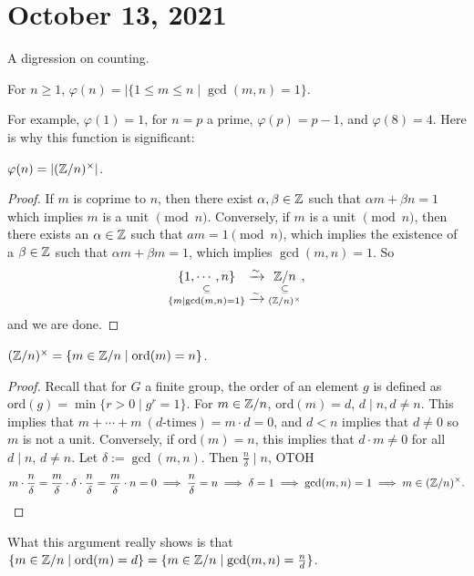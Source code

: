 \section{October 13, 2021} 
A digression on counting.
\begin{definition}
    For $n \geq 1$, $\varphi (n)= | \{1 \leq m \leq n \mid  \gcd(m,n)=1\} $. 
\end{definition}
For example, $\varphi (1)=1$, for $n=p$ a prime, $\varphi (p)=p-1$, and $\varphi (8)=4$. Here is why this function is significant:

\begin{lemma}
    $\varphi (n)=|(\mathbb{Z} / n) ^{\times }|$.
\end{lemma}
\begin{proof}
    If $m$ is coprime to $n$, then there exist $\alpha ,\beta  \in \mathbb{Z}$ such that $\alpha  m + \beta  n = 1$ which implies $m$ is a unit $\pmod n$. Conversely, if $m$ is a unit $\pmod n$, then there exists an $\alpha  \in  \mathbb{Z}$ such that $am=1 \pmod n$, which implies the existence of a $\beta  \in \mathbb{Z}$ such that $\alpha m+\beta m=1$, which implies $\gcd (m,n)=1$.  So \[
        \underset{\{m \mid  \gcd(m,n)=1\} }{\underset{\subseteq }{\{1,\cdots ,n\} } } \underset{\xrightarrow{\sim} }{\underset{\ }{\xrightarrow{\sim}}}    \underset{(\mathbb{Z} /n)^{\times }}{\underset{\subseteq }{\mathbb{Z} /n} } ,
    \] and we are done.
\end{proof}
\begin{lemma}
    $(\mathbb{Z} / n ) ^{\times }=\{m \in \mathbb{Z} /n \mid  \mathrm{ord}(m)=n\} $.
\end{lemma}
\begin{proof}
    Recall that for $G$ a finite group, the order of an element $g$ is defined as $\mathrm{ord}(g)=\min \{r > 0 \mid  g^r=1\} $. For $m \in \mathbb{Z} /n$, $\mathrm{ord}(m)=d$, $d \mid n, d\neq n$. This implies that $m+ \cdots + m \ (d\text{-times})=m \cdot d=0$, and $d<n $ implies that $d\neq 0$ so $m$ is not a unit. Conversely, if $\mathrm{ord}(m)=n$, this implies that $d\cdot  m\neq 0$ for all $d \mid  n$, $d\neq n$. Let $\delta  :=\gcd(m,n)$. Then $\frac{n}{\delta } \mid  n$, OTOH \[
        m \cdot \frac{n}{\delta }= \frac{m}{\delta }\cdot \delta \cdot \frac{n}{\delta }= \frac{m}{\delta }\cdot n=0 \implies  \frac{n}{\delta }=n \implies  \delta =1 \implies \gcd(m,n)=1 \implies m \in (\mathbb{Z} / n)^{\times }.\qedhere
    \] 
\end{proof}
\begin{remark}
    What this argument really shows is that $\{m \in \mathbb{Z} /n \mid  \mathrm{ord}(m)=d\} = \{ m \in  \mathbb{Z} / n \mid  \gcd(m,n)= \frac{n}{d}\} $.
\end{remark}
